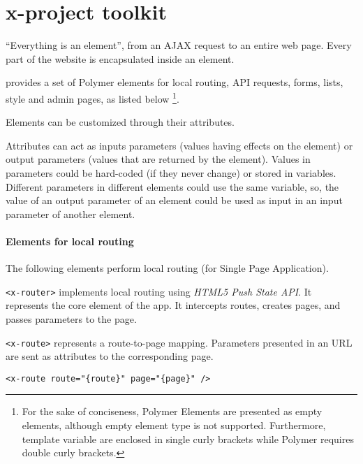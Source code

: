 \section{x-project toolkit}\label{sec:toolkit}

``Everything is an element'', from an AJAX request to an entire web page. Every part of the website is encapsulated inside an element. 

 provides a set of Polymer elements for local routing, API requests, forms, lists, style and admin pages, as listed below \footnote{\scriptsize For the sake of conciseness, Polymer Elements are presented as empty elements, although empty element type is not supported. Furthermore, template variable are enclosed in single curly brackets while Polymer requires double curly brackets.}. 

Elements can be customized through their attributes. 

Attributes can act as inputs parameters (values having effects on the element) or output parameters (values that are returned by the element).
Values in parameters could be hard-coded (if they never change) or stored in variables.
Different parameters in different elements could use the same variable, so, the value of an output parameter of an element could be used as input in an input parameter of another element.

\paragraph{Elements for local routing}

The following elements perform local routing (for Single Page Application).

\vspace{0.2cm}

\texttt{<x-router>} implements local routing using \emph{HTML5 Push State API}. It represents the core element of the app. It intercepts routes, creates pages, and passes parameters to the page.

\vspace{0.2cm}

\texttt{<x-route>} represents a route-to-page mapping. 
Parameters presented in an URL are sent as attributes to the corresponding page.

\begin{lstlisting}[language=HTML5]
<x-route route="{route}" page="{page}" />
\end{lstlisting}

